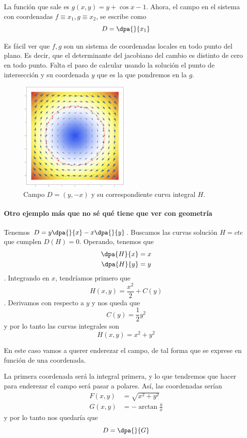 La función que sale es $g(x,y) = y + \cos x - 1$. Ahora, el campo en el sistema con coordenadas $f \equiv x_1,g \equiv x_2$, se escribe como \[ D = \dpa{}{x_1} \]

Es fácil ver que $f,g$ son un sistema de coordenadas locales en todo punto del plano. Es decir, que el determinante del jacobiano del cambio es distinto de cero en todo punto. Falta el paso de calcular usando la solución el punto de intersección y su coordenada $y$ que es la que pondremos en la $g$.

\begin{figure}
\centering
\includegraphics[width=0.5\textwidth]{img/III_CampoCircular.png}
\caption{Campo $D = (y, -x)$ y su correspondiente curva integral $H$.}
\end{figure}

\paragraph{Otro ejemplo más que no sé qué tiene que ver con geometría} Tenemos $D = y \dpa{}{x} - x \dpa{}{y}$. Buscamos las curvas solución $H = cte$ que cumplen $D(H) = 0$. Operando, tenemos que \begin{align*} \dpa{H}{x} &= x \\ \dpa{H}{y} &= y \end{align*}. Integrando en $x$, tendríamos primero que \[ H(x,y) = \frac{x^2}{2} + C(y) \]. Derivamos con respecto a $y$ y nos queda que \[ C(y) = \frac{1}{2}y^2\] y por lo tanto las curvas integrales son \[ H(x,y) = x^2 + y^2\]


En este caso vamos a querer enderezar el campo, de tal forma que se exprese en función de una coordenada.

La primera coordenada será la integral primera, y lo que tendremos que hacer para enderezar el campo será pasar a polares. Así, las coordenadas serían \begin{align*} F(x,y) &= \sqrt{x^2 + y^2}  \\ G(x,y) &= - \arctan \frac{y}{x} \end{align*} y por lo tanto nos quedaría que \[ D = \dpa{}{G} \]

